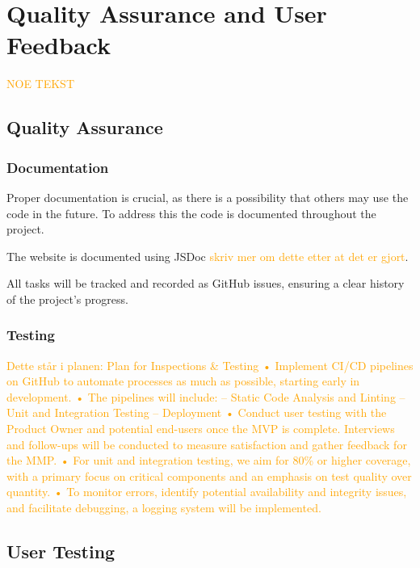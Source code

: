\chapter{Quality Assurance and User Feedback}\label{chap:testinganduserfeedback}

\textcolor{orange}{NOE TEKST}

\section{Quality Assurance}

\subsection{Documentation}

Proper documentation is crucial, as there is a possibility that others may use the code in the
future. To address this the code is documented throughout the project. 

The website is documented using JSDoc \textcolor{orange}{skriv mer om dette etter at det er gjort}.  


All tasks will be tracked and recorded as GitHub issues, ensuring a clear
history of the project’s progress. 

\subsection{Testing} %

\textcolor{orange}{Dette står i planen: Plan for Inspections & Testing
• Implement CI/CD pipelines on GitHub to automate processes as much as possible, starting
early in development.
• The pipelines will include:
– Static Code Analysis and Linting
– Unit and Integration Testing
– Deployment
• Conduct user testing with the Product Owner and potential end-users once the MVP is
complete. Interviews and follow-ups will be conducted to measure satisfaction and gather
feedback for the MMP.
• For unit and integration testing, we aim for 80\% or higher coverage, with a primary focus on
critical components and an emphasis on test quality over quantity.
• To monitor errors, identify potential availability and integrity issues, and facilitate debugging,
a logging system will be implemented.}

\section{User Testing}

